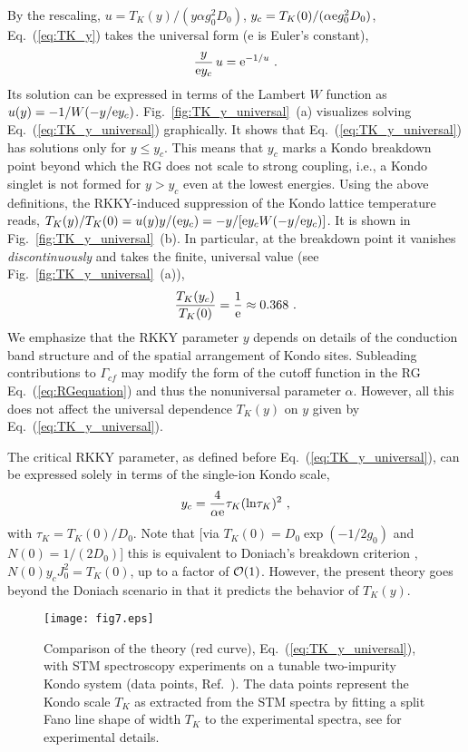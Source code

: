 \documentclass[12pt,twoside]{article}
\newcommand{\Eq}[1]{Eq.~(\ref{#1})}
\begin{document}
By the rescaling,
$u=T_K(y)/(y\alpha g_0^2D_0)$, $y_c=T_K(0)/(\alpha {\rm e} g_0^2D_0)$, 
\Eq{eq:TK_y} takes the universal form ({\rm e} is Euler's constant),
\begin{equation}
\frac{y}{{\rm e}y_c}\, u={\rm e}^{-1/u} \ .
\label{eq:TK_y_universal}
\end{equation}
Its solution can be expressed in terms of the Lambert $W$ function 
\cite{Lambert} as $u(y)=-1/W(-y/{\rm e}y_c)$. 
Fig.~\ref{fig:TK_y_universal}~(a)
visualizes solving \Eq{eq:TK_y_universal} graphically. It shows 
that \Eq{eq:TK_y_universal} has solutions only for $y\leq y_c$. This means that 
$y_c$ marks a Kondo breakdown point beyond which the RG does not scale 
to strong coupling, i.e., a Kondo singlet is not formed for $y>y_c$ 
even at the lowest energies. 
Using the above definitions, the RKKY-induced suppression of the Kondo 
lattice temperature reads, 
$T_K(y)/T_K(0)= u(y)y/({\rm e}y_c)=-y/[{\rm e}y_cW(-y/{\rm e}y_c)]$. It is
shown in Fig.~\ref{fig:TK_y_universal}~(b). In particular, at the breakdown 
point it vanishes {\it discontinuously} and takes the finite, 
universal value (see Fig.~\ref{fig:TK_y_universal}~(a)),
\begin{eqnarray}
\frac{T_{K}(y_c)}{T_K(0)}=\frac{1}{{\rm e}}\approx 0.368\ . 
\label{eq:TK_yc}
\end{eqnarray}
We emphasize that the RKKY parameter $y$ depends on details of the conduction 
band structure and of the spatial arrangement of Kondo sites.
Subleading contributions to $\Gamma_{cf}$ may modify the form of the cutoff 
function in the RG Eq.~(\ref{eq:RGequation}) and thus the nonuniversal 
parameter $\alpha$. However, all this does not affect the universal 
dependence $T_K(y)$ on $y$ given by \Eq{eq:TK_y_universal}.

The critical RKKY parameter, as defined before \Eq{eq:TK_y_universal}, 
can be expressed solely in terms of the single-ion Kondo scale, 
\begin{equation}
y_{c} = \frac{4} {\alpha{\rm e}}\tau_K ({\rm ln}\tau_K)^2\ ,
\label{eq:yc}
\end{equation}
with $\tau_K=T_K(0)/D_0$. 
Note that [via $T_K(0)=D_0 \exp (-1/2g_0)$ and $N(0)=1/(2D_0)$] this is 
equivalent to Doniach's breakdown criterion \cite{Doniach77}, 
$N(0)y_cJ_0^2 = T_K(0)$, up to a factor of ${\cal O}(1)$. However, the present 
theory goes beyond the Doniach scenario in that it predicts the 
behavior of $T_K(y)$. 
 
\begin{figure}[t]
\centering
\texttt{[image: fig7.eps]}
\caption{\label{fig:TK_y_exp_th} Comparison of the theory (red curve), 
\Eq{eq:TK_y_universal}, with STM spectroscopy experiments on a tunable 
two-impurity Kondo system (data points, Ref.~\cite{Bork11}). 
The data points represent the Kondo scale $T_K$ as extracted from the STM
spectra by fitting a split Fano line shape of width $T_K$ to the 
experimental spectra, see \cite{Bork11} for experimental details.} 
\end{figure}
\end{document}
